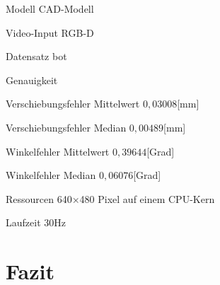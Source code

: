 \documentclass[a4paper, 11pt]{article}
\begin{document}
\begin{multicols*}{2}
    \begin{description*}
        \item[Modell] CAD-Modell
        \item[Video-Input] RGB-D
        \item[Datensatz] \Gls{bot}
        \item[Genauigkeit]
        \begin{itemize*}
            \item Verschiebungsfehler Mittelwert $0,03008$[mm]
            \item Verschiebungsfehler Median $0,00489$[mm]
            \item Winkelfehler Mittelwert $0,39644$[Grad]
            \item Winkelfehler Median $0,06076$[Grad]
        \end{itemize*}
        \item[Ressourcen] 640×480 Pixel auf einem CPU-Kern
        \item[Laufzeit] 30Hz
    \end{description*}

    \section{Fazit}

\end{multicols*}
\end{document}
